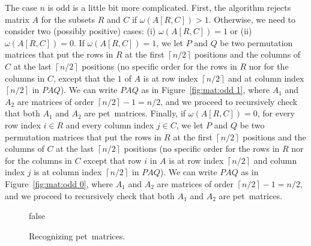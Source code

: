\documentclass[a4paper,10pt]{llncs}
\newcommand{\PET}{pet}
\begin{document}
The case $n$ is odd is a little bit more complicated.
First, the algorithm rejects matrix $A$ for the subsets $R$ and $C$ 
if $\omega(A[R, C]) > 1$.
Otherwise,
we need to consider two (possibly positive) cases:
(i) $\omega(A[R, C]) = 1$ 
or 
(ii) $\omega(A[R, C]) = 0$.
If $\omega(A[R, C]) = 1$, 
we let $P$ and $Q$ be two permutation matrices that put the rows in $R$
at the first $\left\lceil n/2 \right\rceil$ positions and the columns of $C$ 
at the last $\left\lceil n/2 \right\rceil$ positions
(no specific order for the rows in $R$ nor for the columns in $C$, except that the $1$ of
$A$ is at row index $\left\lceil n/2 \right\rceil$ and at column index $\left\lceil n/2 \right\rceil$
in $PAQ$).
We can write $PAQ$ as in Figure~\ref{fig:mat:odd 1},
where $A_1$ and $A_2$ are matrices of order $\left\lceil n/2 \right\rceil - 1 = n/2$,
and we proceed to recursively check that
both $A_1$ and $A_2$ are \PET\  matrices.
Finally, if $\omega(A[R, C]) = 0$, for every row index $i \in R$ and
every column index $j \in C$,
we let $P$ and $Q$ be two permutation matrices that put the rows in $R$
at the first $\left\lceil n/2 \right\rceil$ positions and the columns of $C$ 
at the last $\left\lceil n/2 \right\rceil$ positions
(no specific order for the rows in $R$ nor for the columns in $C$ except that row $i$ in
$A$ is at row index $\left\lceil n/2 \right\rceil$ and column index $j$ is at
column index $\left\lceil n/2 \right\rceil$ in $PAQ$).
We can write $PAQ$ as in Figure~\ref{fig:mat:odd 0},
where $A_1$ and $A_2$ are matrices of order $\left\lceil n/2 \right\rceil - 1 = n/2$,
and we proceed to recursively check that
both $A_1$ and $A_2$ are \PET\ matrices.

\begin{figure}[!t]
  \begin{algorithm}[H]
    \DontPrintSemicolon
    \KwResult{true if $A$ is a \PET\ matrix,
    false otherwise}

    

    \Return false
    \caption{\label{algo:permTriangular}%
    Recognizing \PET\ matrices.}
  \end{algorithm}
\end{figure}
\end{document}
